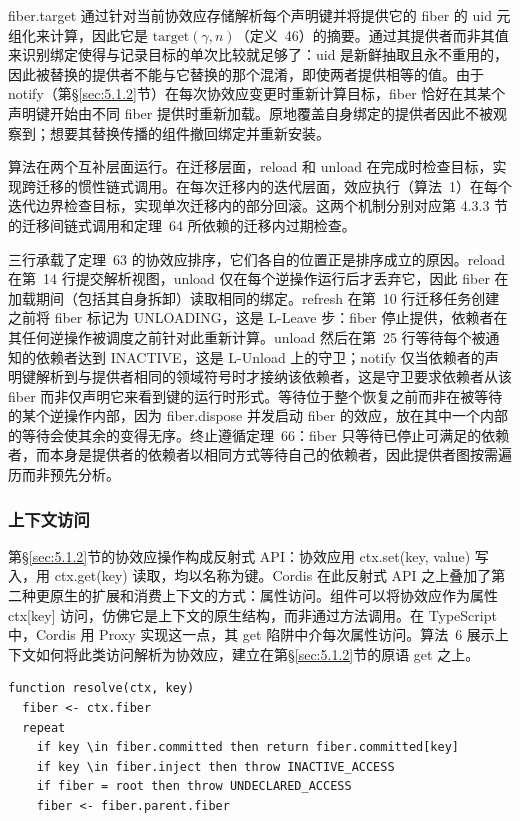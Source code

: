 fiber.target 通过针对当前协效应存储解析每个声明键并将提供它的 fiber 的 uid 元组化来计算，因此它是 $\mathrm{target}(\gamma, n)$（定义~46）的摘要。通过其提供者而非其值来识别绑定使得与记录目标的单次比较就足够了：uid 是新鲜抽取且永不重用的，因此被替换的提供者不能与它替换的那个混淆，即使两者提供相等的值。由于 notify（第\S\ref{sec:5.1.2}节）在每次协效应变更时重新计算目标，fiber 恰好在其某个声明键开始由不同 fiber 提供时重新加载。原地覆盖自身绑定的提供者因此不被观察到；想要其替换传播的组件撤回绑定并重新安装。

算法在两个互补层面运行。在迁移层面，reload 和 unload 在完成时检查目标，实现跨迁移的惯性链式调用。在每次迁移内的迭代层面，效应执行（算法~1）在每个迭代边界检查目标，实现单次迁移内的部分回滚。这两个机制分别对应第 4.3.3 节的迁移间链式调用和定理~64 所依赖的迁移内过期检查。

三行承载了定理~63 的协效应排序，它们各自的位置正是排序成立的原因。reload 在第~14 行提交解析视图，unload 仅在每个逆操作运行后才丢弃它，因此 fiber 在加载期间（包括其自身拆卸）读取相同的绑定。refresh 在第~10 行迁移任务创建之前将 fiber 标记为 UNLOADING，这是 L-Leave 步：fiber 停止提供，依赖者在其任何逆操作被调度之前针对此重新计算。unload 然后在第~25 行等待每个被通知的依赖者达到 INACTIVE，这是 L-Unload 上的守卫；notify 仅当依赖者的声明键解析到与提供者相同的领域符号时才接纳该依赖者，这是守卫要求依赖者从该 fiber 而非仅声明它来看到键的运行时形式。等待位于整个恢复之前而非在被等待的某个逆操作内部，因为 fiber.dispose 并发启动 fiber 的效应，放在其中一个内部的等待会使其余的变得无序。终止遵循定理~66：fiber 只等待已停止可满足的依赖者，而本身是提供者的依赖者以相同方式等待自己的依赖者，因此提供者图按需遍历而非预先分析。

\subsubsection{上下文访问}\label{sec:5.1.4}

第\S\ref{sec:5.1.2}节的协效应操作构成反射式 API：协效应用 ctx.set(key, value) 写入，用 ctx.get(key) 读取，均以名称为键。Cordis 在此反射式 API 之上叠加了第二种更原生的扩展和消费上下文的方式：属性访问。组件可以将协效应作为属性 ctx[key] 访问，仿佛它是上下文的原生结构，而非通过方法调用。在 TypeScript 中，Cordis 用 Proxy 实现这一点，其 get 陷阱中介每次属性访问。算法~6 展示上下文如何将此类访问解析为协效应，建立在第\S\ref{sec:5.1.2}节的原语 get 之上。

\begin{lstlisting}[caption={代理中介的上下文访问}]
function resolve(ctx, key)
  fiber <- ctx.fiber
  repeat
    if key \in fiber.committed then return fiber.committed[key]
    if key \in fiber.inject then throw INACTIVE_ACCESS
    if fiber = root then throw UNDECLARED_ACCESS
    fiber <- fiber.parent.fiber
\end{lstlisting}

